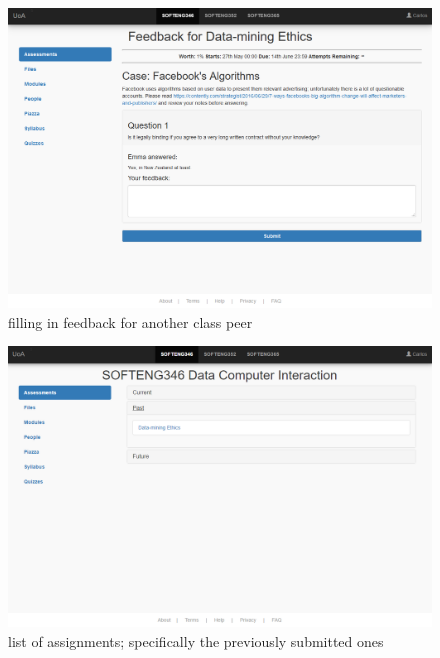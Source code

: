 \documentclass[10pt,a4paper]{article}
\begin{document}
	\begin{figure}[H]
		\centering
		\includegraphics[width=\textwidth]{3 - Feedback for Data-mining Ethics.PNG}
		\caption{filling in feedback for another class peer}
		\label{fig:three}
	\end{figure}
	\begin{figure}[H]
		\centering
		\includegraphics[width=\textwidth]{4 - Assessments (Past).PNG}
		\caption{list of assignments; specifically the previously submitted ones}
		\label{fig:four}
	\end{figure}
\end{document}
